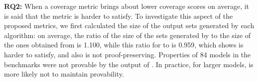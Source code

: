
\textbf{RQ2:} When a coverage metric brings about lower coverage scores on average,
it is said that the metric is harder to satisfy. To investigate this aspect of the proposed metrics,
we first calculated the size of the output sets generated by each algorithm: on average, the ratio of the size of the sets generated by \ucalg to the size of the ones obtained from \ucbfalg is 1.100,
while this ratio for \mustalg to \ucbfalg is 0.959, which shows \mustalg is harder to satisfy, and also is not proof-preserving. Properties of 84 models in the benchmarks were not
provable by the output of \mustalg . In practice, for larger
models, \mustalg is more likely not to maintain provability.

